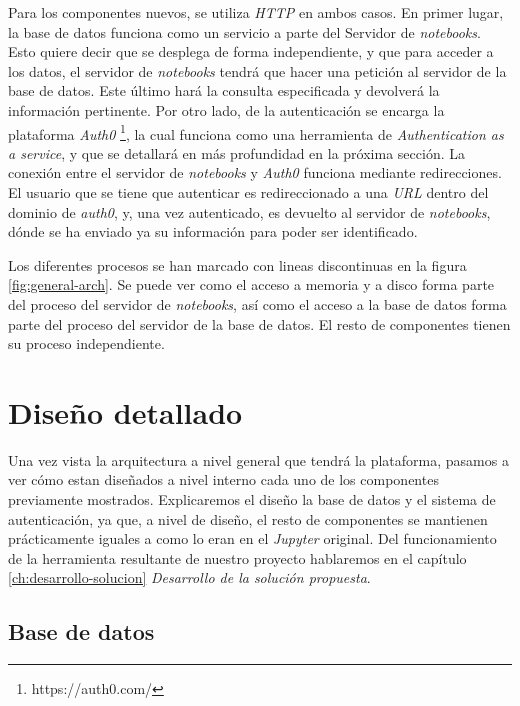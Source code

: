 \documentclass[11pt,spanish,listoffigures]{tfgetsinf}
\begin{document}
Para los componentes nuevos, se utiliza \textit{HTTP} en ambos casos. En primer lugar, la base de datos funciona como un servicio a parte del Servidor de \textit{notebooks}. Esto quiere decir que se desplega de forma independiente, y que para acceder a los datos, el servidor de \textit{notebooks} tendrá que hacer una petición al servidor de la base de datos. Este último hará la consulta especificada y devolverá la información pertinente. Por otro lado, de la autenticación se encarga la plataforma \textit{Auth0} \footnote{https://auth0.com/}, la cual funciona como una herramienta de \textit{Authentication as a service}, y que se detallará en más profundidad en la próxima sección. La conexión entre el servidor de \textit{notebooks} y \textit{Auth0} funciona mediante redirecciones. El usuario que se tiene que autenticar es redireccionado a una \textit{URL} dentro del dominio de \textit{auth0}, y, una vez autenticado, es devuelto al servidor de \textit{notebooks}, dónde se ha enviado ya su información para poder ser identificado. 

Los diferentes procesos se han marcado con lineas discontinuas en la figura \ref{fig:general-arch}. Se puede ver como el acceso a memoria y a disco forma parte del proceso del servidor de \textit{notebooks}, así como el acceso a la base de datos forma parte del proceso del servidor de la base de datos. El resto de componentes tienen su proceso independiente.



\section{Diseño detallado}
\label{sec:diseno-detallado}

Una vez vista la arquitectura a nivel general que tendrá la plataforma, pasamos a ver cómo estan diseñados a nivel interno cada uno de los componentes previamente mostrados. Explicaremos  el diseño la base de datos y el sistema de autenticación, ya que, a nivel de diseño, el resto de componentes se mantienen prácticamente iguales a como lo eran en el \textit{Jupyter} original. Del funcionamiento de la herramienta resultante de nuestro proyecto hablaremos en el capítulo \ref{ch:desarrollo-solucion} \textit{Desarrollo de la solución propuesta}.


\subsection{Base de datos}
\label{subsec:diseno-bd}
\end{document}
